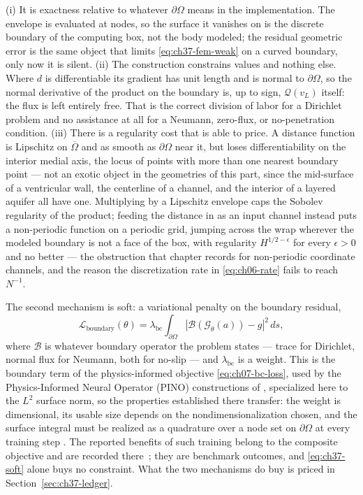 (i) It is exactness relative to whatever $\partial\Omega$ means in the implementation. The envelope
is evaluated at nodes, so the surface it vanishes on is the discrete boundary of the computing box,
not the body modeled; the residual geometric error is the same object that limits
\eqref{eq:ch37-fem-weak} on a curved boundary, only now it is silent. (ii) The construction
constrains values and nothing else. Where $d$ is differentiable its gradient has unit length and is
normal to $\partial\Omega$, so the normal derivative of the product on the boundary is, up to sign,
$\mathcal{Q}(v_L)$ itself: the flux is left entirely free. That is the correct division of labor for
a Dirichlet problem and no assistance at all for a Neumann, zero-flux, or no-penetration condition.
(iii) There is a regularity cost that
 is able to price. A distance function
is Lipschitz on $\overline{\Omega}$ and as smooth as $\partial\Omega$ near it, but loses
differentiability on the interior medial axis, the locus of points with more than one nearest
boundary point  --- not an exotic object in the geometries of this part, since the mid-surface of a
ventricular wall, the centerline of a channel, and the interior of a layered aquifer all have one.
Multiplying by a Lipschitz envelope caps the Sobolev regularity of the product; feeding the distance
in as an input channel instead puts a non-periodic function on a periodic grid, jumping across the
wrap wherever the modeled boundary is not a face of the box, with regularity
$H^{1/2-\epsilon}$ for every $\epsilon>0$ and no better --- the obstruction that chapter records for
non-periodic coordinate channels, and the reason the discretization rate in \eqref{eq:ch06-rate}
fails to reach $N^{-1}$.

The second mechanism is soft: a variational penalty on the boundary residual,
\begin{equation}
  \label{eq:ch37-soft}
  \mathcal{L}_{\text{boundary}}(\theta) = \lambda_{\text{bc}} \int_{\partial\Omega} |\mathcal{B}(\mathcal{G}_\theta(a)) - g|^2 \, ds,
\end{equation}
where $\mathcal{B}$ is whatever boundary operator the problem states --- trace for Dirichlet, normal
flux for Neumann, both for no-slip --- and $\lambda_{\text{bc}}$ is a weight. This is the boundary term
of the physics-informed objective \eqref{eq:ch07-bc-loss}, used by the Physics-Informed Neural
Operator (PINO) constructions of ,
specialized here to the $L^2$ surface norm, so the properties established there transfer: the weight
is dimensional, its usable size depends on the nondimensionalization chosen, and the surface integral
must be realized as a quadrature over a node set on $\partial\Omega$ at every training step
.
The reported benefits of such training belong to the composite objective and are recorded there~\cite{li2021physics,raissi2019physics};
they are benchmark outcomes, and \eqref{eq:ch37-soft} alone buys no constraint. What the two
mechanisms do buy is priced in Section~\ref{sec:ch37-ledger}.

